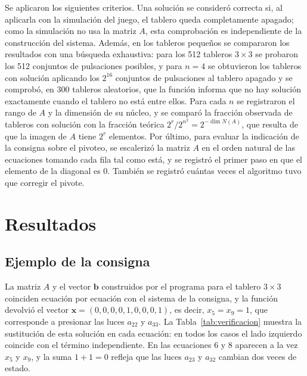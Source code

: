\documentclass[12pt,a4paper]{article}
\theoremstyle{plain}
\theoremstyle{definition}
\theoremstyle{remark}
\begin{document}
Se aplicaron los siguientes criterios. Una solución se consideró correcta si, al aplicarla con la simulación del juego, el tablero queda completamente apagado; como la simulación no usa la matriz $A$, esta comprobación es independiente de la construcción del sistema. Además, en los tableros pequeños se compararon los resultados con una búsqueda exhaustiva: para los 512 tableros $3\times 3$ se probaron los 512 conjuntos de pulsaciones posibles, y para $n=4$ se obtuvieron los tableros con solución aplicando los $2^{16}$ conjuntos de pulsaciones al tablero apagado y se comprobó, en 300 tableros aleatorios, que la función informa que no hay solución exactamente cuando el tablero no está entre ellos. Para cada $n$ se registraron el rango de $A$ y la dimensión de su núcleo, y se comparó la fracción observada de tableros con solución con la fracción teórica $2^{r}/2^{n^2}=2^{-\dim N(A)}$, que resulta de que la imagen de $A$ tiene $2^r$ elementos. Por último, para evaluar la indicación de la consigna sobre el pivoteo, se escalerizó la matriz $A$ en el orden natural de las ecuaciones tomando cada fila tal como está, y se registró el primer paso en que el elemento de la diagonal es 0. También se registró cuántas veces el algoritmo tuvo que corregir el pivote.

\section{Resultados}\label{sec:resultados}

\subsection{Ejemplo de la consigna}\label{sec:res_ejemplo}

La matriz $A$ y el vector $\mathbf{b}$ construidos por el programa para el tablero $3\times 3$ coinciden ecuación por ecuación con el sistema de la consigna, y la función devolvió el vector $\mathbf{x}=(0,0,0,0,1,0,0,0,1)$, es decir, $x_5=x_9=1$, que corresponde a presionar las luces $a_{22}$ y $a_{33}$. La Tabla~\ref{tab:verificacion} muestra la sustitución de esta solución en cada ecuación: en todos los casos el lado izquierdo coincide con el término independiente. En las ecuaciones 6 y 8 aparecen a la vez $x_5$ y $x_9$, y la suma $1+1=0$ refleja que las luces $a_{23}$ y $a_{32}$ cambian dos veces de estado.
\end{document}
